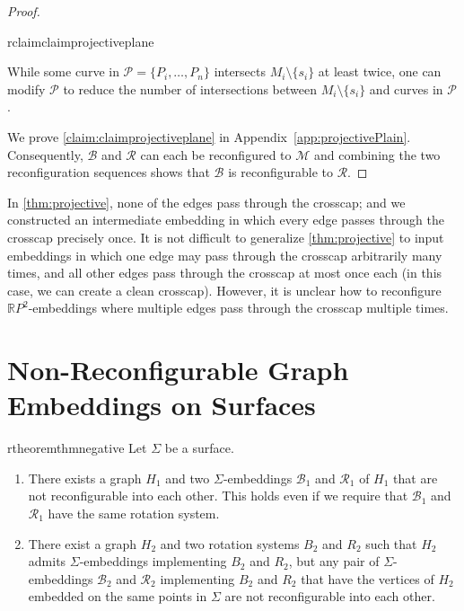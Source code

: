 \documentclass[a4paper,USenglish,cleveref,colorlinks=true,urlcolor=black,linkcolor=black,citecolor=black,thm-restate,authorcolumns]{lipics-v2021}
\newcommand{\prooflink}[1]{\hypersetup{linkcolor=lipicsBulletGray}\hyperref[#1]{$\blacktriangledown$}}
\newcommand{\statlink}[1]{\hypersetup{linkcolor=lipicsYellow}\hyperref[#1]{$\blacktriangle$}}
\newcommand{\mylink}{}
\newcommand{\cprooflink}[1]{\hypersetup{linkcolor=lipicsBulletGray}\hyperref[#1]{$\triangledown$}}
\newcommand{\cstatlink}[1]{\hypersetup{linkcolor=lipicsYellow}\hyperref[#1]{$\vartriangle$}}
\newcommand{\cmylink}{}
\theoremstyle{claimstyle}
\begin{document}
\begin{proof}
    \begin{restatable}{rclaim}{claimprojectiveplane}
        \label{claim:claimprojectiveplane}
        \renewcommand{\cmylink}{\cstatlink{claim:claimprojectiveplane}\cprooflink{Pclaimprojectiveplane}}

        While some curve in $\mathcal{P} = \{P_i,\ldots ,P_n\}$ intersects $M_i\setminus \{s_i\}$ at least twice,
        one can modify $\mathcal{P}$ to reduce the
        number of intersections between $M_i\setminus \{s_i\}$ and
        curves in $\mathcal{P}$.
    \end{restatable}

    We prove \cref{claim:claimprojectiveplane} in Appendix~\ref{app:projectivePlain}.
    Consequently, $\mathcal{B}$ and $\mathcal{R}$ can each be reconfigured to  $\mathcal{M}$ and combining the two reconfiguration sequences
    shows that $\mathcal{B}$ is reconfigurable to $\mathcal{R}$.
\end{proof}

\begin{remark}
    In \cref{thm:projective},  none of the edges pass through the crosscap; and we constructed an intermediate embedding in which every edge passes through the crosscap precisely once.
    It is not difficult to generalize \cref{thm:projective} to input embeddings in which one edge may pass through the crosscap arbitrarily many times, and all other edges pass through the crosscap at most once each (in this case, we can create a clean crosscap).
    However, it is unclear how to reconfigure $\mathbb{R}P^2$-embeddings where multiple edges pass through the crosscap multiple times.
\end{remark}

\section{Non-Reconfigurable Graph Embeddings on Surfaces}
\label{sec:counter}



\begin{restatable}{rtheorem}{thmnegative}
    \label{thm:negative}
    \renewcommand{\mylink}{\statlink{thm:negative}\prooflink{Pnegative}}
    Let $\Sigma$ be a surface.
    \begin{enumerate}[1.]
        \item\label{thm:negative:1} There exists a graph $H_1$ and two $\Sigma$-embeddings $\mathcal{B}_1$ and $\mathcal{R}_1$ of $H_1$ that are not reconfigurable into each other.
              This holds even if we require that $\mathcal{B}_1$ and $\mathcal{R}_1$ have the same rotation system.
        \item\label{thm:negative:2} There exist a graph $H_2$ and two rotation systems $B_2$ and $R_2$ such that $H_2$ admits $\Sigma$-embeddings implementing $B_2$ and $R_2$,
              but any pair of $\Sigma$-embeddings $\mathcal{B}_2$ and $\mathcal{R}_2$ implementing $B_2$ and $R_2$ that have the vertices of $H_2$ embedded on the same points in $\Sigma$ are not reconfigurable into each other.
    \end{enumerate}
\end{restatable}
\end{document}
